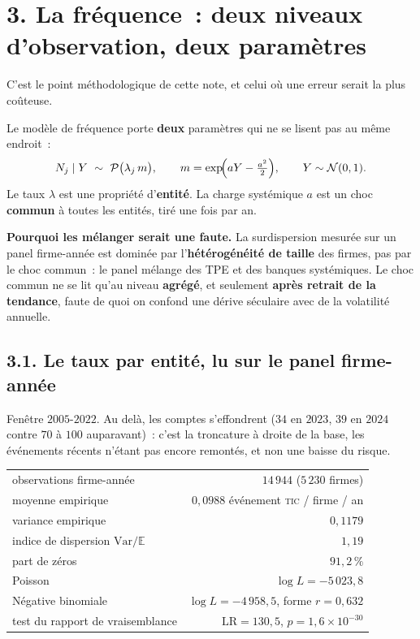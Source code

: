 \documentclass[11pt,a4paper]{article}
\begin{document}
\section*{3. La fréquence~: deux niveaux d'observation, deux paramètres}

C'est le point méthodologique de cette note, et celui où une erreur serait la plus coûteuse.

Le modèle de fréquence porte \textbf{deux} paramètres qui ne se lisent pas au même endroit~:
\begin{equation}
  N_j \mid Y \ \sim\ \mathcal{P}\bigl(\lambda_j\, m\bigr),
  \qquad m=\exp\!\Bigl(aY-\tfrac{a^2}{2}\Bigr),
  \qquad Y\sim\mathcal{N}(0,1).
  \label{eq:freq}
\end{equation}
Le taux $\lambda$ est une propriété d'\textbf{entité}. La charge systémique $a$ est un choc
\textbf{commun} à toutes les entités, tiré une fois par an.

\begin{cle}[colback=orange!8,colframe=orange!70!black]
\textbf{Pourquoi les mélanger serait une faute.} La surdispersion mesurée sur un panel
firme-année est dominée par l'\textbf{hétérogénéité de taille} des firmes, pas par le choc
commun~: le panel mélange des TPE et des banques systémiques. Le choc commun ne se lit
qu'au niveau \textbf{agrégé}, et seulement \textbf{après retrait de la tendance}, faute de
quoi on confond une dérive séculaire avec de la volatilité annuelle.
\end{cle}

\subsection*{3.1. Le taux par entité, lu sur le panel firme-année}

Fenêtre $2005$-$2022$. Au delà, les comptes s'effondrent ($34$ en $2023$, $39$ en $2024$
contre $70$ à $100$ auparavant)~: c'est la troncature à droite de la base, les événements
récents n'étant pas encore remontés, et non une baisse du risque.

\begin{center}\small
\begin{tabular}{@{}l r@{}}
\toprule
observations firme-année & $14\,944$ \;($5\,230$ firmes) \\
moyenne empirique & $0{,}0988$ événement \textsc{tic} / firme / an \\
variance empirique & $0{,}1179$ \\
indice de dispersion $\mathrm{Var}/\mathbb{E}$ & $1{,}19$ \\
part de zéros & $91{,}2\,\%$ \\
\midrule
Poisson & $\log L = -5\,023{,}8$ \\
Négative binomiale & $\log L = -4\,958{,}5$, \; forme $r=0{,}632$ \\
test du rapport de vraisemblance & $\mathrm{LR}=130{,}5$, \; $p=1{,}6\times10^{-30}$ \\
\bottomrule
\end{tabular}
\end{center}
\end{document}
